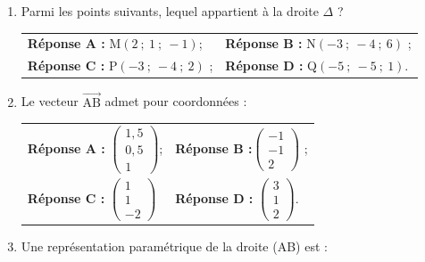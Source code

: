 \documentclass[10pt]{article}
\providecommand{\vect}[1]{\overrightarrow{#1}}
\begin{document}
\begin{enumerate}
\item Parmi les points suivants, lequel appartient à la droite $\Delta$ ?
\begin{center}
\begin{tabularx}{\linewidth}{X X}
\textbf{Réponse A :} M$(2~;~1~;~-1)$; & \textbf{Réponse B :} N$(-3~;~-4~;~6)$ ;\\
\textbf{Réponse C :} P$(-3~;~-4~;~2)$ ; & \textbf{Réponse D :} Q$(-5~;~-5~;~1)$.
\end{tabularx}
\end{center}

\item Le vecteur $\vect{\text{AB}}$ admet pour coordonnées : 

\begin{center}
\begin{tabularx}{\linewidth}{X X}
\textbf{Réponse A :} $\begin{pmatrix}1,5\\0,5\\1\end{pmatrix}$;& \textbf{Réponse B :}$\begin{pmatrix}-1\\-1\\2\end{pmatrix}$ ;\\
\textbf{Réponse C :} $\begin{pmatrix}1\\1\\-2\end{pmatrix}$& \textbf{Réponse D :} $\begin{pmatrix}3\\1\\2\end{pmatrix}$.
\end{tabularx}
\end{center}

\item Une représentation paramétrique de la droite (AB) est :


\end{enumerate}
\end{document}
